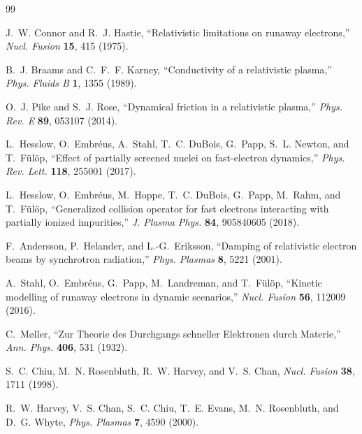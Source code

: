 \documentclass[11pt]{article}
\begin{document}
\begin{thebibliography}{99}

J.~W. Connor and R.~J. Hastie,
``Relativistic limitations on runaway electrons,''
\emph{Nucl. Fusion} \textbf{15}, 415 (1975).

B.~J. Braams and C.~F.~F. Karney,
``Conductivity of a relativistic plasma,''
\emph{Phys. Fluids B} \textbf{1}, 1355 (1989).

O.~J. Pike and S.~J. Rose,
``Dynamical friction in a relativistic plasma,''
\emph{Phys. Rev. E} \textbf{89}, 053107 (2014).

L.~Hesslow, O.~Embr\'eus, A.~Stahl, T.~C. DuBois, G.~Papp,
S.~L. Newton, and T.~F{\"u}l{\"o}p,
``Effect of partially screened nuclei on fast-electron dynamics,''
\emph{Phys. Rev. Lett.} \textbf{118}, 255001 (2017).

L.~Hesslow, O.~Embr\'eus, M.~Hoppe, T.~C. DuBois, G.~Papp,
M.~Rahm, and T.~F{\"u}l{\"o}p,
``Generalized collision operator for fast electrons interacting with partially ionized impurities,''
\emph{J. Plasma Phys.} \textbf{84}, 905840605 (2018).

F.~Andersson, P.~Helander, and L.-G.~Eriksson,
``Damping of relativistic electron beams by synchrotron radiation,''
\emph{Phys. Plasmas} \textbf{8}, 5221 (2001).

A.~Stahl, O.~Embr{\'e}us, G.~Papp, M.~Landreman, and T.~F{\"u}l{\"o}p,
``Kinetic modelling of runaway electrons in dynamic scenarios,''
\emph{Nucl. Fusion} \textbf{56}, 112009 (2016).

C.~M{\o}ller,
``Zur Theorie des Durchgangs schneller Elektronen durch Materie,''
\emph{Ann. Phys.} \textbf{406}, 531 (1932).

S.~C. Chiu, M.~N. Rosenbluth, R.~W. Harvey, and V.~S. Chan,
\emph{Nucl. Fusion} \textbf{38}, 1711 (1998).

R.~W. Harvey, V.~S. Chan, S.~C. Chiu, T.~E. Evans,
M.~N. Rosenbluth, and D.~G. Whyte,
\emph{Phys. Plasmas} \textbf{7}, 4590 (2000).


\end{thebibliography}
\end{document}
